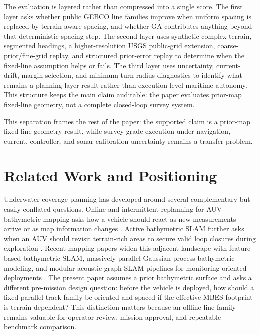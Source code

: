 \documentclass[jmse,article,submit,moreauthors]{Definitions/mdpi}
\begin{document}
The evaluation is layered rather than compressed into a single score. The first layer asks whether public GEBCO line families improve when uniform spacing is replaced by terrain-aware spacing, and whether GA contributes anything beyond that deterministic spacing step. The second layer uses synthetic complex terrain, segmented headings, a higher-resolution USGS public-grid extension, coarse-prior/fine-grid replay, and structured prior-error replay to determine when the fixed-line assumption helps or fails. The third layer uses uncertainty, current-drift, margin-selection, and minimum-turn-radius diagnostics to identify what remains a planning-layer result rather than execution-level maritime autonomy. This structure keeps the main claim auditable: the paper evaluates prior-map fixed-line geometry, not a complete closed-loop survey system.

This separation frames the rest of the paper: the supported claim is a prior-map fixed-line geometry result, while survey-grade execution under navigation, current, controller, and sonar-calibration uncertainty remains a transfer problem.

\section{Related Work and Positioning}
\label{sec:related}
Underwater coverage planning has developed around several complementary but easily conflated questions. Online and intermittent replanning for AUV bathymetric mapping asks how a vehicle should react as new measurements arrive or as map information changes \cite{shi2020data,zhang2022online}. Active bathymetric SLAM further asks when an AUV should revisit terrain-rich areas to secure valid loop closures during exploration \cite{ling2023active}. Recent mapping papers widen this adjacent landscape with feature-based bathymetric SLAM, massively parallel Gaussian-process bathymetric modeling, and modular acoustic graph SLAM pipelines for monitoring-oriented deployments \cite{zhang2024tttslam,krasnosky2022gp,real2025acousticgraphslam,xu2025usoslam}. The present paper assumes a prior bathymetric surface and asks a different pre-mission design question: before the vehicle is deployed, how should a fixed parallel-track family be oriented and spaced if the effective MBES footprint is terrain dependent? This distinction matters because an offline line family remains valuable for operator review, mission approval, and repeatable benchmark comparison.
\end{document}
